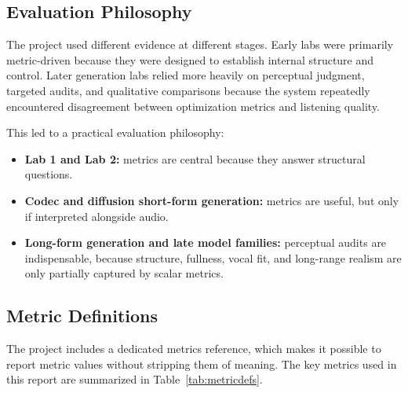 \documentclass[conference]{IEEEtran}
\begin{document}
\subsection{Evaluation Philosophy}
The project used different evidence at different stages. Early labs were primarily metric-driven because they were designed to establish internal structure and control. Later generation labs relied more heavily on perceptual judgment, targeted audits, and qualitative comparisons because the system repeatedly encountered disagreement between optimization metrics and listening quality.

This led to a practical evaluation philosophy:
\begin{itemize}[leftmargin=1.5em]
    \item \textbf{Lab 1 and Lab 2:} metrics are central because they answer structural questions.
    \item \textbf{Codec and diffusion short-form generation:} metrics are useful, but only if interpreted alongside audio.
    \item \textbf{Long-form generation and late model families:} perceptual audits are indispensable, because structure, fullness, vocal fit, and long-range realism are only partially captured by scalar metrics.
\end{itemize}

\subsection{Metric Definitions}
The project includes a dedicated metrics reference, which makes it possible to report metric values without stripping them of meaning. The key metrics used in this report are summarized in Table~\ref{tab:metricdefs}.
\end{document}
